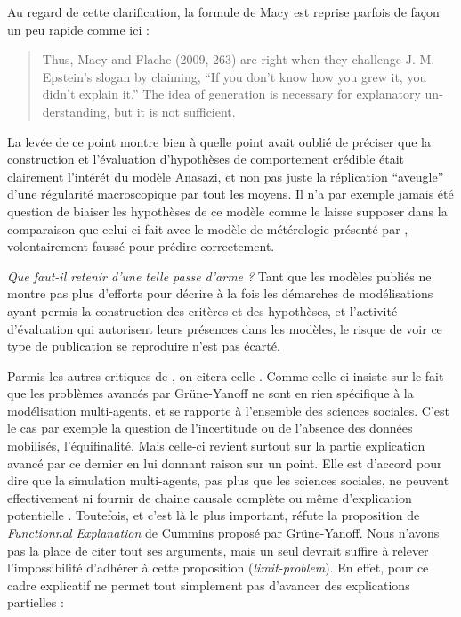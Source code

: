 Au regard de cette clarification, la formule de Macy est reprise parfois de façon un peu rapide comme ici : 

\foreignblockquote{english}[\cite{Marchionni2013}]{Thus, Macy and Flache (2009, 263) are right when they challenge J. M. Epstein’s slogan by claiming, \enquote{If you don’t know how you grew it, you didn’t explain it.} The idea of generation is necessary for explanatory understanding, but it is not sufficient.}

La levée de ce point montre bien à quelle point \textcite{Yanoff2008} avait oublié de préciser que la construction et l'évaluation d'hypothèses de comportement crédible était clairement l'intérét du modèle Anasazi, et non pas juste la réplication \enquote{aveugle} d'une régularité macroscopique par tout les moyens. Il n'a par exemple jamais été question de biaiser les hypothèses de ce modèle comme le laisse supposer \textcite{Yanoff2008} dans la comparaison que celui-ci fait avec le modèle de métérologie présenté par \textcite{Kuppers2005}, volontairement faussé pour prédire correctement. 

\textit{Que faut-il retenir d'une telle passe d'arme ?} Tant que les modèles publiés ne montre pas plus d'efforts pour décrire à la fois les démarches de modélisations ayant permis la construction des critères et des hypothèses, et l'activité d'évaluation qui autorisent leurs présences dans les modèles, le risque de voir ce type de publication se reproduire n'est pas écarté.

Parmis les autres critiques de \textcite{Yanoff2008}, on citera celle \textcite{Elsenbroich2012}. Comme \textcite{Chattoe2011} celle-ci insiste sur le fait que les problèmes avancés par Grüne-Yanoff ne sont en rien spécifique à la modélisation multi-agents, et se rapporte à l'ensemble des sciences sociales. C'est le cas par exemple la question de l'incertitude ou de l'absence des données mobilisés, l'équifinalité. Mais celle-ci revient surtout sur la partie explication avancé par ce dernier en lui donnant raison sur un point. Elle est d'accord pour dire que la simulation multi-agents, pas plus que les sciences sociales, ne peuvent effectivement ni fournir de chaine causale complète ou même d'explication potentielle . Toutefois, et c'est là le plus important, \textcite{Elsenbroich2012} réfute la proposition de \textit{Functionnal Explanation} de Cummins proposé par Grüne-Yanoff. Nous n'avons pas la place de citer tout ses arguments, mais un seul devrait suffire à relever l'impossibilité d'adhérer à cette proposition (\textit{limit-problem}). En effet, pour \textcite{Elsenbroich2012} ce cadre explicatif ne permet tout simplement pas d'avancer des explications partielles : 

